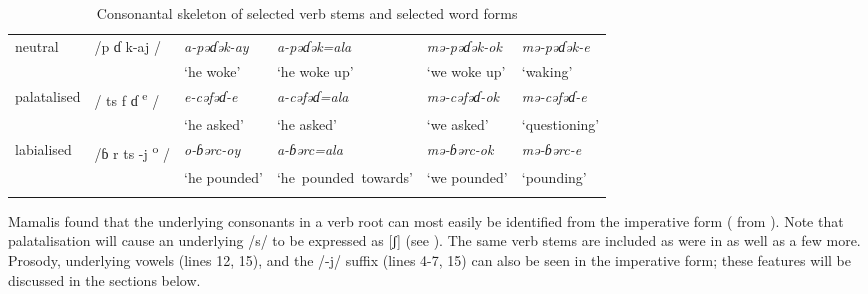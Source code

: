\begin{table}
{\begin{tabular}{lp{2cm}lp{3.25cm}p{2.5cm}p{2.5cm}}
neutral         &     /p ɗ k-aj /   &  \textit{a-pəɗək-ay}     & \textit{a-pəɗək=ala}  & \textit{mə-pəɗək-ok}  & \textit{mə-pəɗək-e}\\
                &                          &  ‘he woke’              & ‘he woke up’    & ‘we woke up’     & ‘waking’\\
palatalised     &     / ts f ɗ \textsuperscript{e} /      &  \textit{e-cəfəɗ-e}   & \textit{a-cəfəɗ=ala} & \textit{mə-cəfəɗ-ok}     & \textit{mə-cəfəɗ-e}\\
                &    &  ‘he asked’               & ‘he asked’             & ‘we asked’   & ‘questioning’\\
labialised      &     /ɓ r ts -j \textsuperscript{o} /    &  \textit{o-ɓərc-oy}   & \textit{a-ɓərc=ala}  & \textit{mə-ɓərc-ok}     & \textit{mə-ɓərc-e}\\
                &                                         &  ‘he pounded’             & \mbox{‘he pounded towards’}   & ‘we pounded’    & ‘pounding’\\
\lspbottomrule
\end{tabular}}
\caption{Consonantal skeleton of selected verb stems and selected word forms\label{tab:37}}
\end{table}

Mamalis found that the underlying consonants in a verb root can most easily be identified from the {\twoS} imperative form ( from \citealt{FriesenMamalis2008}). Note that palatalisation will cause an underlying /s/ to be expressed as [ʃ] (see ). The same verb stems are included as were in  as well as a few more. Prosody, underlying vowels (lines 12, 15), and the /-j/ suffix (lines 4-7, 15) can also be seen in the imperative form; these features will be discussed in the sections below.

